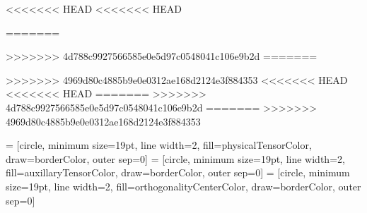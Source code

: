 \usepackage{tikz}
\usepackage{ifthen}

\usetikzlibrary{decorations.markings}
\usetikzlibrary{arrows}

<<<<<<< HEAD
<<<<<<< HEAD

\def \defaultTensorWidth {19pt}
\def \smallTensorWidth {10pt}
=======

\def \defaultTensorWidth {19pt}
>>>>>>> 4d788c9927566585e0e5d97c0548041c106e9b2d
=======

\def \defaultTensorWidth {19pt}
>>>>>>> 4969d80c4885b9e0e0312ae168d2124e3f884353
\def \defaultLineWidth {2}
\def \xOffsetUnitCell {180pt}
\def \yOffsetUnitCell {180pt}
\def \yOffsetPhysicalLeg {30pt}
\def \defaultArrowscale {0.7}
\def \defaultArrowXShift {7pt}
\def \defaultTextOffset {6pt}
\def \defaultDistanceNormal {40pt}
\def \defaultDistanceEquations {30pt}
\def \identityLegDistance {10 pt}
<<<<<<< HEAD
<<<<<<< HEAD
\def \backgroundopacity {0.5}
=======
>>>>>>> 4d788c9927566585e0e5d97c0548041c106e9b2d
=======
>>>>>>> 4969d80c4885b9e0e0312ae168d2124e3f884353

 = [circle, minimum size=\defaultTensorWidth, line width=\defaultLineWidth, fill=physicalTensorColor, draw=borderColor, outer sep=0]
 = [circle, minimum size=\defaultTensorWidth, line width=\defaultLineWidth, fill=auxillaryTensorColor, draw=borderColor, outer sep=0]
 = [circle, minimum size=\defaultTensorWidth, line width=\defaultLineWidth, fill=orthogonalityCenterColor, draw=borderColor, outer sep=0]

